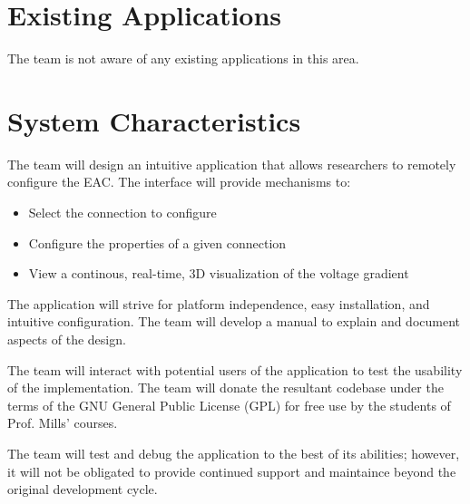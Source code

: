\section{Existing Applications}
The team is not aware of any existing applications in this area.

\section{System Characteristics}
The team will design an intuitive application that allows researchers to remotely configure the EAC.  The interface will provide mechanisms to:

\begin{itemize}
	\item Select the connection to configure
	\item Configure the properties of a given connection
	\item View a continous, real-time, 3D visualization of the voltage gradient
\end{itemize}

The application will strive for platform independence, easy installation, and intuitive configuration.  The team will develop a manual to explain and document aspects of the design.  

The team will interact with potential users of the application to test the usability of the implementation.  The team will donate the resultant codebase under the terms of the GNU General Public License (GPL) for free use by the students of Prof. Mills' courses.

The team will test and debug the application to the best of its abilities; however, it will not be obligated to provide continued support and maintaince beyond the original development cycle.